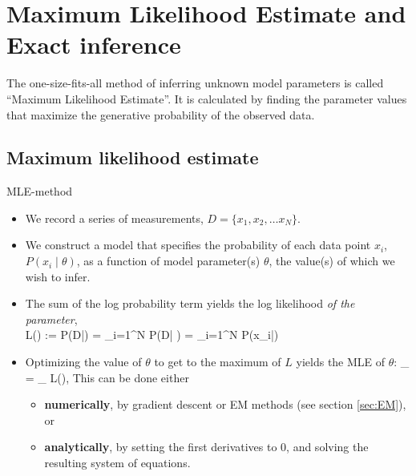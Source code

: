 \section{Maximum Likelihood Estimate and Exact inference}

The one-size-fits-all method of inferring unknown model parameters is called ``Maximum Likelihood Estimate''. It is calculated by finding the parameter values that maximize the generative probability of the observed data.

\subsection{Maximum likelihood estimate}
\no MLE-method
\begin{itemize}
	\item We record a series of measurements, $D = \{x_1, x_2, \ldots x_N\}$.
	\item We construct a model that specifies the probability of each data point $x_i$, $P(x_i\;|\;\theta)$, as a function of model parameter(s) $\theta$, the value(s) of which we wish to infer.
	\item The sum of the log probability term yields the log likelihood \emph{of the parameter}, \\
	\be
		L(\theta) := \log P(D\;|\;\theta) = \log \prod_{i=1}^N P(D\;|\; \theta) = \sum_{i=1}^N \log P(x_i\;|\;\theta)
	\ee
	\item Optimizing the value of $\theta$ to get to the maximum of $L$ yields the MLE of $\theta$: 
	\be
		\theta_ = _{\theta} L(\theta),
	\ee
	This can be done either
	\begin{itemize}
		\item {\bf numerically}, by gradient descent or EM methods (see section \ref{sec:EM}), or
		\item {\bf analytically}, by setting the first derivatives to 0, and solving the resulting system of equations.
	\end{itemize}
		
\end{itemize}

